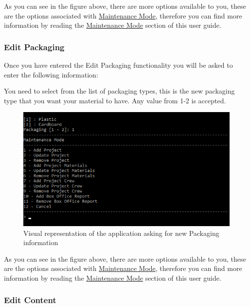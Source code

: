 \documentclass[
  english,
  a4paper,
,tablecaptionabove
]{scrartcl}
\begin{document}
As you can see in the figure above, there are more options available to
you, these are the options associated with
\protect\hyperlink{using-maintenance-mode}{Maintenance Mode}, therefore
you can find more information by reading the
\protect\hyperlink{using-maintenance-mode}{Maintenance Mode} section of
this user guide.

\newpage

\hypertarget{edit-packaging-1}{%
\subsubsection{Edit Packaging}\label{edit-packaging-1}}

Once you have entered the Edit Packaging functionality you will be asked
to enter the following information:

You need to select from the list of packaging types, this is the new
packaging type that you want your material to have. Any value from 1-2
is accepted.

\begin{figure}
\centering
\includegraphics{images/user-guide/maintenance-mode/update-project-material-packaging.png}
\caption{Visual representation of the application asking for new
Packaging information}
\end{figure}

As you can see in the figure above, there are more options available to
you, these are the options associated with
\protect\hyperlink{using-maintenance-mode}{Maintenance Mode}, therefore
you can find more information by reading the
\protect\hyperlink{using-maintenance-mode}{Maintenance Mode} section of
this user guide.

\newpage

\hypertarget{edit-content-1}{%
\subsubsection{Edit Content}\label{edit-content-1}}
\end{document}
